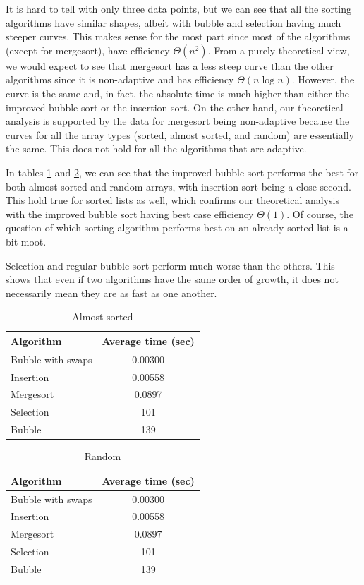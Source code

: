 \documentclass[letterpaper, 11pt]{article}
\begin{document}
It is hard to tell with only three data points, but we can see that all the
sorting algorithms have similar shapes, albeit with bubble and selection having
much steeper curves. This makes sense for the most part since most of the
algorithms (except for mergesort), have efficiency \(\Theta(n^2)\). From a
purely theoretical view, we would expect to see that mergesort has a less steep
curve than the other algorithms since it is non-adaptive and has efficiency
\(\Theta(n \log n)\). However, the curve is the same and, in fact, the absolute
time is much higher than either the improved bubble sort or the insertion sort.
On the other hand, our theoretical analysis is supported by the data for
mergesort being non-adaptive because the curves for all the array types
(sorted, almost sorted, and random) are essentially the same. This does not
hold for all the algorithms that are adaptive.  

In tables \ref{table:almost} and \ref{table:random}, we can see that the
improved bubble sort performs the best for both almost sorted and random
arrays, with insertion sort being a close second. This hold true for sorted
lists as well, which confirms our theoretical analysis with the improved bubble
sort having best case efficiency \(\Theta(1)\). Of course, the question of
which sorting algorithm performs best on an already sorted list is a bit moot.  

Selection and regular bubble sort perform much worse than the others. This
shows that even if two algorithms have the same order of growth, it does not
necessarily mean they are as fast as one another. 

\begin{table}[h]
\centering
  \begin{tabular}{l c}
    Algorithm & Average time (sec) \\
    \hline
    Bubble with swaps &  0.00300\\
    Insertion        &   0.00558\\
    Mergesort       &    0.0897\\
    Selection      &  101\\
    Bubble         &  139\\
  \end{tabular}
  \caption{Almost sorted}
  \label{table:almost}
\end{table}

\begin{table}[h]
\centering
  \begin{tabular}{l c}
    Algorithm & Average time (sec) \\
    \hline
		Bubble with swaps   & 0.00300\\
		Insertion           & 0.00558\\
		Mergesort           & 0.0897 \\
		Selection           & 101\\
		Bubble              & 139\\
  \end{tabular}
  \caption{Random}
  \label{table:random}
\end{table}
\end{document}
